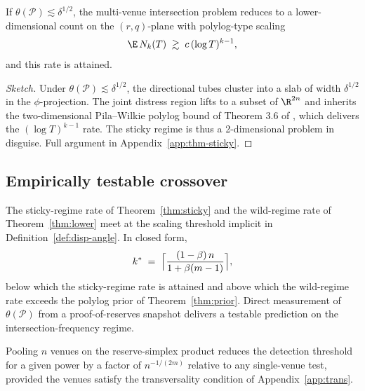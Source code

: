 \begin{theorem}\label{thm:sticky}
If $\theta(\mathcal{P}) \lesssim \delta^{1/2}$, the multi-venue
intersection problem reduces to a lower-dimensional count on the
$(r,q)$-plane with polylog-type scaling
\begin{equation}\label{eq:sticky}
\E\,N_k(T) \;\gtrsim\; c\,(\log T)^{k-1},
\end{equation}
and this rate is attained.
\end{theorem}

\begin{proof}[Sketch]
Under $\theta(\mathcal{P}) \lesssim \delta^{1/2}$, the directional
tubes cluster into a slab of width $\delta^{1/2}$ in the
$\phi$-projection. The joint distress region lifts to a subset of
$\R^{2n}$ and inherits the two-dimensional Pila--Wilkie polylog
bound of Theorem 3.6 of \citet{PilaWilkie2006}, which delivers the
$(\log T)^{k-1}$ rate. The sticky regime is thus a 2-dimensional
problem in disguise. Full argument in Appendix~\ref{app:thm-sticky}.
\end{proof}

\subsection{Empirically testable crossover}
\label{sec:thm-crossover}

\begin{corollary}\label{cor:crossover}
The sticky-regime rate of Theorem~\ref{thm:sticky} and the
wild-regime rate of Theorem~\ref{thm:lower} meet at the scaling
threshold implicit in Definition~\ref{def:disp-angle}. In closed
form,
\begin{equation}\label{eq:crossover}
k^\ast \;=\; \Bigl\lceil
\frac{(1-\beta)\, n}{1 + \beta(m-1)} \Bigr\rceil,
\end{equation}
below which the sticky-regime rate is attained and above which the
wild-regime rate exceeds the polylog prior of
Theorem~\ref{thm:prior}. Direct measurement of $\theta(\mathcal{P})$
from a proof-of-reserves snapshot delivers a testable prediction on
the intersection-frequency regime.
\end{corollary}

\begin{theorem}\label{thm:pooling}
Pooling $n$ venues on the reserve-simplex product reduces the
detection threshold for a given power by a factor of $n^{-1/(2m)}$
relative to any single-venue test, provided the venues satisfy the
transversality condition of Appendix~\ref{app:trans}.
\end{theorem}

